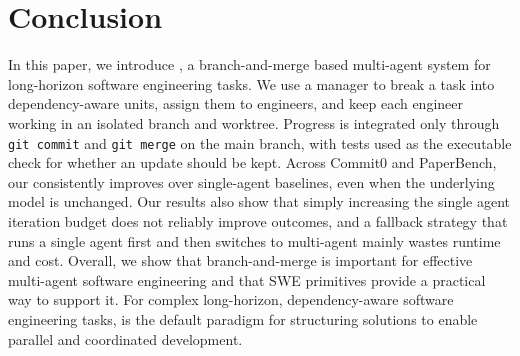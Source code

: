 \section{Conclusion}
\label{sec:conclusion}
In this paper, we introduce \ourmethod, a branch-and-merge based multi-agent system for long-horizon software engineering tasks. We use a manager to break a task into dependency-aware units, assign them to engineers, and keep each engineer working in an isolated branch and worktree. Progress is integrated only through \texttt{git commit} and \texttt{git merge} on the main branch, with tests used as the executable check for whether an update should be kept. Across Commit0 and PaperBench, our \ourmethod consistently improves over single-agent baselines, even when the underlying model is unchanged. Our results also show that simply increasing the single agent iteration budget does not reliably improve outcomes, and a fallback strategy that runs a single agent first and then switches to multi-agent mainly wastes runtime and cost. Overall, we show that branch-and-merge is important for effective multi-agent software engineering and that SWE primitives provide a practical way to support it. For complex long-horizon, dependency-aware software engineering tasks, \ourmethod is the default paradigm for structuring solutions to enable parallel and coordinated development.



